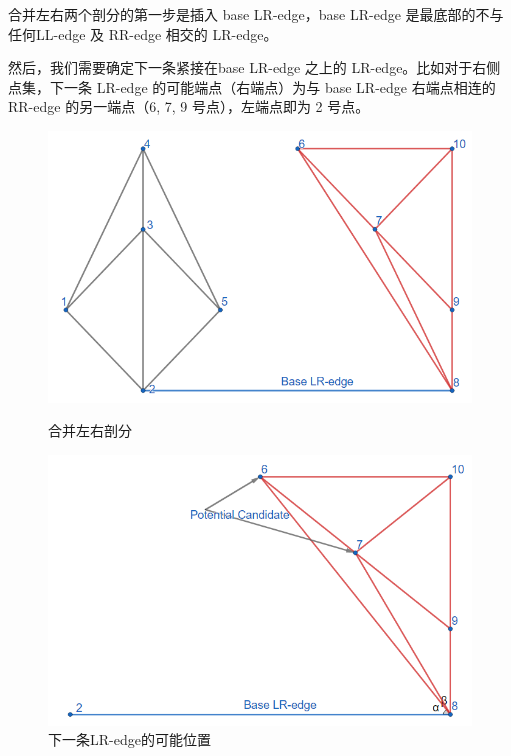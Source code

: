 合并左右两个剖分的第一步是插入 base LR-edge，base LR-edge 是最底部的不与任何LL-edge 及 RR-edge 相交的 LR-edge。


然后，我们需要确定下一条紧接在base LR-edge 之上的 LR-edge。比如对于右侧点集，下一条 LR-edge 的可能端点（右端点）为与 base LR-edge 右端点相连的 RR-edge 的另一端点（6, 7, 9 号点），左端点即为 2 号点。
\begin{figure}[htbp]
    \centering
    \begin{minipage}{0.4\textwidth}
        \centering
        \includegraphics[width=\textwidth]
        {figures/DT4.png}
        \caption{合并左右剖分}
    \end{minipage}
    \begin{minipage}{0.4\textwidth}
        \centering
        \includegraphics[width=\textwidth]
        {figures/DT5.png}
        \caption{下一条LR-edge的可能位置}
    \end{minipage}
\end{figure}

